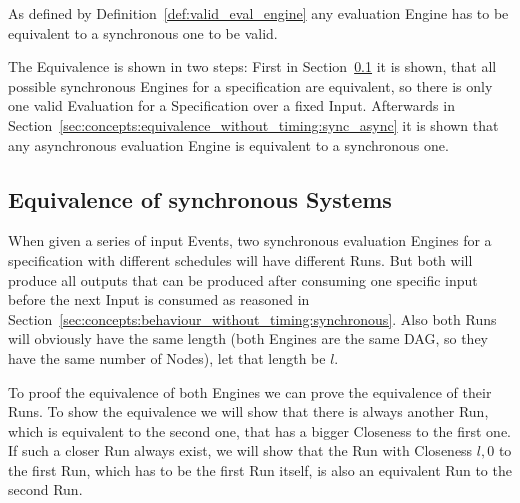 As defined by Definition~\ref{def:valid_eval_engine} any evaluation Engine has to be equivalent to a synchronous one to be valid.

The Equivalence is shown in two steps: First in Section~\ref{sec:concepts:equivalence_without_timing:synchronous} it is shown, that all possible synchronous Engines for a specification are equivalent, so there is only one valid Evaluation for a Specification over a fixed Input.
Afterwards in Section~\ref{sec:concepts:equivalence_without_timing:sync_async} it is shown that any asynchronous evaluation Engine is equivalent to a synchronous one.


\subsection{Equivalence of synchronous Systems}
\label{sec:concepts:equivalence_without_timing:synchronous}

When given a series of input Events, two synchronous evaluation Engines for a specification with different schedules will have different Runs.
But both will produce all outputs that can be produced after consuming one specific input before the next Input is consumed as reasoned in Section~\ref{sec:concepts:behaviour_without_timing:synchronous}.
Also both Runs will obviously have the same length (both Engines are the same DAG, so they have the same number of Nodes), let that length be \(l\).

To proof the equivalence of both Engines we can prove the equivalence of their Runs.
To show the equivalence we will show that there is always another Run, which is equivalent to the second one, that has a bigger Closeness to the first one.
If such a closer Run always exist, we will show that the Run with Closeness \(l, 0\) to the first Run, which has to be the first Run itself, is also an equivalent Run to the second Run.

